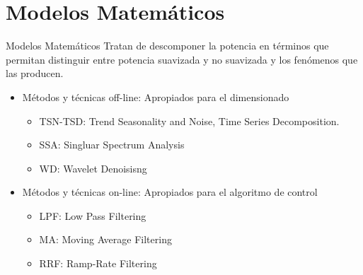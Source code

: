 \section[Modelos Matemáticos]{Modelos Matemáticos}

%
%
%
%
\begin{frame}{Modelos Matemáticos}
Tratan de descomponer la potencia en términos que permitan distinguir entre potencia suavizada y no suavizada y los fenómenos que las producen. \\[2ex]
\begin{itemize}
    \item Métodos y técnicas off-line: Apropiados para el dimensionado \\[1ex]
    \begin{itemize}
        \item TSN-TSD: Trend Seasonality and Noise, Time Series Decomposition.\\[1ex]
        \item SSA: Singluar Spectrum Analysis\\[1ex]
        \item WD: Wavelet Denoisisng\\[2ex]
    \end{itemize}
    \item Métodos y técnicas on-line: Apropiados para el algoritmo de control\\[1ex]
    \begin{itemize}
        \item LPF: Low Pass Filtering \\[1ex]
        \item MA: Moving Average Filtering \\[1ex]
        \item RRF: Ramp-Rate Filtering \\[2ex]
    \end{itemize}{}
\end{itemize}
\end{frame}
%
%
%
